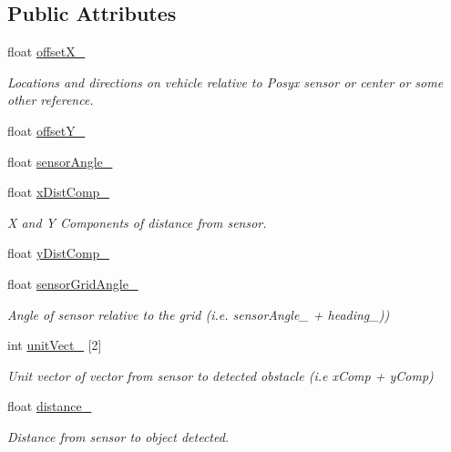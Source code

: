 \subsection*{Public Attributes}
\begin{DoxyCompactItemize}
\item 
float \mbox{\hyperlink{class_obstacle_sensor_ad660e8750c49e39615247660afbf35f4}{offset\+X\+\_\+}}
\begin{DoxyCompactList}\small\item\em Locations and directions on vehicle relative to Posyx sensor or center or some other reference. \end{DoxyCompactList}\item 
float \mbox{\hyperlink{class_obstacle_sensor_a491bcf65a2db112bc56b5c3af0c0fce7}{offset\+Y\+\_\+}}
\item 
float \mbox{\hyperlink{class_obstacle_sensor_a348cf9783f793442c56f1b34e3515dbb}{sensor\+Angle\+\_\+}}
\item 
float \mbox{\hyperlink{class_obstacle_sensor_ac13b7eab4b79c41cb51058c0351d1ae6}{x\+Dist\+Comp\+\_\+}}
\begin{DoxyCompactList}\small\item\em X and Y Components of distance from sensor. \end{DoxyCompactList}\item 
float \mbox{\hyperlink{class_obstacle_sensor_a05dad8b177a43a804153f1240656e4c0}{y\+Dist\+Comp\+\_\+}}
\item 
float \mbox{\hyperlink{class_obstacle_sensor_a063ee604be2c3b6ed8034cafedda0c3d}{sensor\+Grid\+Angle\+\_\+}}
\begin{DoxyCompactList}\small\item\em Angle of sensor relative to the grid (i.\+e. sensor\+Angle\+\_\+ + heading\+\_\+)) \end{DoxyCompactList}\item 
int \mbox{\hyperlink{class_obstacle_sensor_ab03d3a917fc37e816f35949f1185fbc7}{unit\+Vect\+\_\+}} \mbox{[}2\mbox{]}
\begin{DoxyCompactList}\small\item\em Unit vector of vector from sensor to detected obstacle (i.\+e x\+Comp + y\+Comp) \end{DoxyCompactList}\item 
float \mbox{\hyperlink{class_obstacle_sensor_ac38c343c22e4f8afbde0b04b928f07cc}{distance\+\_\+}}
\begin{DoxyCompactList}\small\item\em Distance from sensor to object detected. \end{DoxyCompactList}\item 

\end{DoxyCompactItemize}
